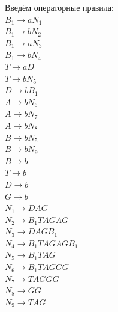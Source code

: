 \documentclass[a4paper,14pt]{extarticle}
\begin{document}
\begin{enumerate}[1.]
Введём операторные правила:\\
$B_1 \rightarrow aN_1$\\
$B_1 \rightarrow bN_2$\\
$B_1 \rightarrow aN_3$\\
$B_1 \rightarrow bN_4$\\
$T \rightarrow aD$\\ 
$T \rightarrow bN_5$\\
$D \rightarrow bB_1$\\
$A \rightarrow bN_6$\\
$A \rightarrow bN_7$\\
$A \rightarrow bN_8$\\
$B \rightarrow bN_5$\\ 
$B \rightarrow bN_9$\\ 
$B \rightarrow b$\\
$T \rightarrow b$\\
$D \rightarrow b$\\
$G \rightarrow b$\\
$N_1 \rightarrow DAG$\\
$N_2 \rightarrow B_1TAGAG$\\
$N_3 \rightarrow DAGB_1$\\
$N_4 \rightarrow B_1TAGAGB_1$\\
$N_5 \rightarrow B_1TAG$\\
$N_6 \rightarrow B_1TAGGG$\\
$N_7 \rightarrow TAGGG$\\
$N_8 \rightarrow GG$\\
$N_9 \rightarrow TAG$\\


\end{enumerate}
\end{document}
